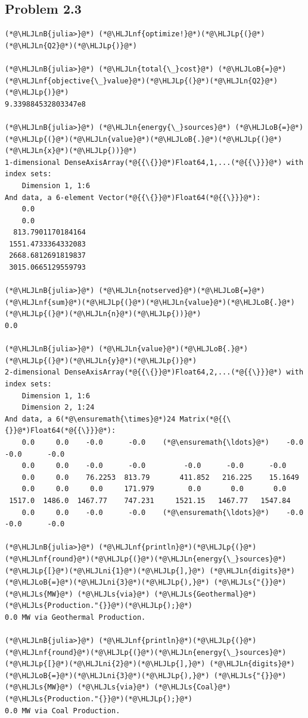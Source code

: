 \documentclass[12pt,a4paper]{article}
\newcommand{\HLJLn}[1]{#1}
\newcommand{\HLJLnf}[1]{\textcolor[RGB]{66,102,213}{#1}}
\newcommand{\HLJLs}[1]{\textcolor[RGB]{201,61,57}{#1}}
\newcommand{\HLJLnB}[1]{\textcolor[RGB]{59,151,46}{#1}}
\newcommand{\HLJLni}[1]{\textcolor[RGB]{59,151,46}{#1}}
\newcommand{\HLJLoB}[1]{\textcolor[RGB]{102,102,102}{\textbf{#1}}}
\newcommand{\HLJLp}[1]{#1}
\begin{document}
\subsection{Problem 2.3}

\begin{lstlisting}
(*@\HLJLnB{julia>}@*) (*@\HLJLnf{optimize!}@*)(*@\HLJLp{(}@*)(*@\HLJLn{Q2}@*)(*@\HLJLp{)}@*)

(*@\HLJLnB{julia>}@*) (*@\HLJLn{total{\_}cost}@*) (*@\HLJLoB{=}@*) (*@\HLJLnf{objective{\_}value}@*)(*@\HLJLp{(}@*)(*@\HLJLn{Q2}@*)(*@\HLJLp{)}@*)
9.339884532803347e8

(*@\HLJLnB{julia>}@*) (*@\HLJLn{energy{\_}sources}@*) (*@\HLJLoB{=}@*) (*@\HLJLp{(}@*)(*@\HLJLn{value}@*)(*@\HLJLoB{.}@*)(*@\HLJLp{(}@*)(*@\HLJLn{x}@*)(*@\HLJLp{))}@*)
1-dimensional DenseAxisArray(*@{{\{}}@*)Float64,1,...(*@{{\}}}@*) with index sets:
    Dimension 1, 1:6
And data, a 6-element Vector(*@{{\{}}@*)Float64(*@{{\}}}@*):
    0.0
    0.0
  813.7901170184164
 1551.4733364332083
 2668.6812691819837
 3015.0665129559793

(*@\HLJLnB{julia>}@*) (*@\HLJLn{notserved}@*)(*@\HLJLoB{=}@*) (*@\HLJLnf{sum}@*)(*@\HLJLp{(}@*)(*@\HLJLn{value}@*)(*@\HLJLoB{.}@*)(*@\HLJLp{(}@*)(*@\HLJLn{n}@*)(*@\HLJLp{))}@*)
0.0

(*@\HLJLnB{julia>}@*) (*@\HLJLn{value}@*)(*@\HLJLoB{.}@*)(*@\HLJLp{(}@*)(*@\HLJLn{y}@*)(*@\HLJLp{)}@*)
2-dimensional DenseAxisArray(*@{{\{}}@*)Float64,2,...(*@{{\}}}@*) with index sets:
    Dimension 1, 1:6
    Dimension 2, 1:24
And data, a 6(*@\ensuremath{\times}@*)24 Matrix(*@{{\{}}@*)Float64(*@{{\}}}@*):
    0.0     0.0    -0.0      -0.0    (*@\ensuremath{\ldots}@*)    -0.0      -0.0      -0.0
    0.0     0.0    -0.0      -0.0         -0.0      -0.0      -0.0
    0.0     0.0    76.2253  813.79       411.852   216.225    15.1649
    0.0     0.0     0.0     171.979        0.0       0.0       0.0
 1517.0  1486.0  1467.77    747.231     1521.15   1467.77   1547.84
    0.0     0.0    -0.0      -0.0    (*@\ensuremath{\ldots}@*)    -0.0      -0.0      -0.0

(*@\HLJLnB{julia>}@*) (*@\HLJLnf{println}@*)(*@\HLJLp{(}@*)(*@\HLJLnf{round}@*)(*@\HLJLp{(}@*)(*@\HLJLn{energy{\_}sources}@*)(*@\HLJLp{[}@*)(*@\HLJLni{1}@*)(*@\HLJLp{],}@*) (*@\HLJLn{digits}@*) (*@\HLJLoB{=}@*)(*@\HLJLni{3}@*)(*@\HLJLp{),}@*) (*@\HLJLs{"{}}@*) (*@\HLJLs{MW}@*) (*@\HLJLs{via}@*) (*@\HLJLs{Geothermal}@*) (*@\HLJLs{Production."{}}@*)(*@\HLJLp{);}@*)
0.0 MW via Geothermal Production.

(*@\HLJLnB{julia>}@*) (*@\HLJLnf{println}@*)(*@\HLJLp{(}@*)(*@\HLJLnf{round}@*)(*@\HLJLp{(}@*)(*@\HLJLn{energy{\_}sources}@*)(*@\HLJLp{[}@*)(*@\HLJLni{2}@*)(*@\HLJLp{],}@*) (*@\HLJLn{digits}@*) (*@\HLJLoB{=}@*)(*@\HLJLni{3}@*)(*@\HLJLp{),}@*) (*@\HLJLs{"{}}@*) (*@\HLJLs{MW}@*) (*@\HLJLs{via}@*) (*@\HLJLs{Coal}@*) (*@\HLJLs{Production."{}}@*)(*@\HLJLp{);}@*)
0.0 MW via Coal Production.


\end{lstlisting}
\end{document}

